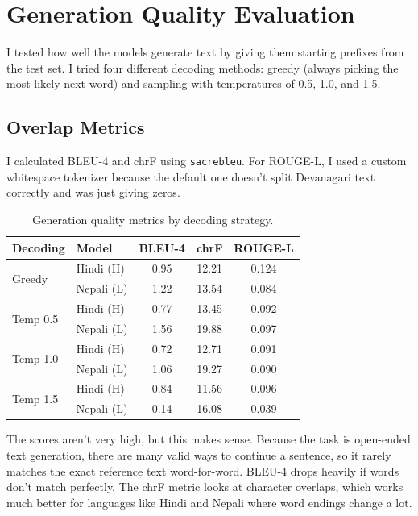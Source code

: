 \documentclass[11pt,a4paper]{article}
\begin{document}
\section{Generation Quality Evaluation}

I tested how well the models generate text by giving them starting prefixes from the test set. I tried four different decoding methods: greedy (always picking the most likely next word) and sampling with temperatures of 0.5, 1.0, and 1.5.

\subsection{Overlap Metrics}

I calculated BLEU-4 and chrF using \texttt{sacrebleu}. For ROUGE-L, I used a custom whitespace tokenizer because the default one doesn't split Devanagari text correctly and was just giving zeros.

\begin{table}[H]
\centering
\caption{Generation quality metrics by decoding strategy.}
\label{tab:genquality}
\begin{tabular}{llccc}
\toprule
\textbf{Decoding} & \textbf{Model} & \textbf{BLEU-4} & \textbf{chrF} & \textbf{ROUGE-L} \\
\midrule
\multirow{2}{*}{Greedy}   & Hindi (H)   & 0.95  & 12.21 & 0.124 \\
                           & Nepali (L)  & 1.22  & 13.54 & 0.084 \\
\midrule
\multirow{2}{*}{Temp 0.5} & Hindi (H)   & 0.77  & 13.45 & 0.092 \\
                           & Nepali (L)  & 1.56  & 19.88 & 0.097 \\
\midrule
\multirow{2}{*}{Temp 1.0} & Hindi (H)   & 0.72  & 12.71 & 0.091 \\
                           & Nepali (L)  & 1.06  & 19.27 & 0.090 \\
\midrule
\multirow{2}{*}{Temp 1.5} & Hindi (H)   & 0.84  & 11.56 & 0.096 \\
                           & Nepali (L)  & 0.14  & 16.08 & 0.039 \\
\bottomrule
\end{tabular}
\end{table}

The scores aren't very high, but this makes sense. Because the task is open-ended text generation, there are many valid ways to continue a sentence, so it rarely matches the exact reference text word-for-word. BLEU-4 drops heavily if words don't match perfectly. The chrF metric looks at character overlaps, which works much better for languages like Hindi and Nepali where word endings change a lot.
\end{document}
